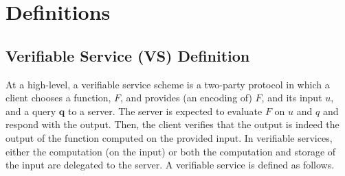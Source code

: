 
\section{Definitions}\label{Definition}

\subsection{Verifiable Service (VS) Definition}\label{subsec:VS}
At a high-level, a verifiable service scheme is a two-party protocol in which a client chooses a function, $F$, and provides (an encoding of) $F$, and its input $u$, and a query $\bm{q}$ to a server.  The server is expected to evaluate $F$ on $u$ and $q$ and respond with the output. Then, the client  verifies that the output is indeed the output of the function computed on the provided input. In verifiable services, either the computation (on the input) or both the computation and storage of the input are delegated to the server. A verifiable service is defined as follows. 


